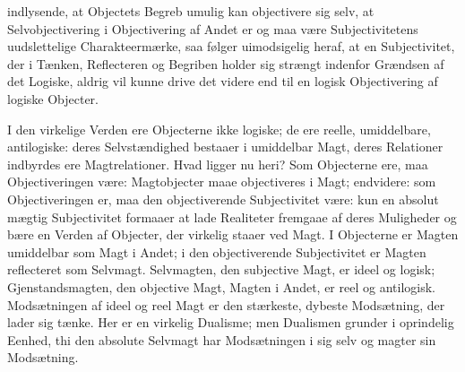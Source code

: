 \documentclass[12pt]{article}
\newcommand{\opage}[1]{\marginnote{\footnotesize\textit{[#1]}}}
\begin{document}
indlysende, at Objectets Begreb umulig kan objectivere sig selv, at
Selvobjectivering i Objectivering af Andet er og maa være
Subjectivitetens uudslettelige Charakteermærke, saa følger
uimodsigelig heraf, at en Subjectivitet, der i Tænken, Reflecteren
og Begriben holder sig strængt indenfor Grændsen af det Logiske,
aldrig vil kunne drive det videre end til en logisk Objectivering af
logiske Objecter.

\opage{36} I den virkelige Verden ere Objecterne ikke logiske; de ere reelle,
umiddelbare, antilogiske: deres Selvstændighed bestaaer i
umiddelbar Magt, deres Relationer indbyrdes ere Magtrelationer.
Hvad ligger nu heri? Som Objecterne ere, maa Objectiveringen være:
Magtobjecter maae objectiveres i Magt; endvidere: som
Objectiveringen er, maa den objectiverende Subjectivitet være: kun
en absolut mægtig Subjectivitet formaaer at lade Realiteter
fremgaae af deres Muligheder og bære en Verden af Objecter, der
virkelig staaer ved Magt. I Objecterne er Magten umiddelbar som
Magt i Andet; i den objectiverende Subjectivitet er Magten
reflecteret som Selvmagt. Selvmagten, den subjective Magt, er ideel
og logisk; Gjenstandsmagten, den objective Magt, Magten i Andet, er
reel og antilogisk. Modsætningen af ideel og reel Magt er den
stærkeste, dybeste Modsætning, der lader sig tænke. Her er en
virkelig Dualisme; men Dualismen grunder i oprindelig Eenhed, thi
den absolute Selvmagt har Modsætningen i sig selv og magter sin
Modsætning.
\end{document}
